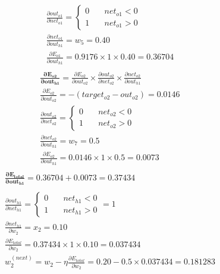 \documentclass[12pt]{article}
\begin{document}
\begin{enumerate}
\begin{gather*}
\frac{\partial{out_{o1}}}{\partial{net_{o1}}} = \begin{cases}
0 & \quad net_{o1} < 0\\
1 & \quad net_{o1} > 0
\end{cases}\\
\frac{\partial{net_{o1}}}{\partial{out_{h1}}} = w_5 = 0.40\\
\frac{\partial{E_{o1}}}{\partial{out_{h1}}} = 0.9176 \times 1 \times 0.40 = 0.36704\\
\end{gather*}
\begin{gather*}
\mathbf{\frac{\partial{E_{o2}}}{\partial{out_{h1}}}} =  \frac{\partial{E_{o2}}}{\partial{out_{o2}}} \times \frac{\partial{out_{o2}}}{\partial{net_{o2}}} \times \frac{\partial{net_{o2}}}{\partial{out_{h1}}}\\
\frac{\partial{E_{o2}}}{\partial{out_{o2}}} = -(target_{o2} - out_{o2}) = 0.0146\\
\frac{\partial{out_{o2}}}{\partial{net_{o2}}} = \begin{cases}
0 & \quad net_{o2} < 0\\
1 & \quad net_{o2} > 0
\end{cases}\\
\frac{\partial{net_{o2}}}{\partial{out_{h1}}} = w_7 = 0.5\\
\frac{\partial{E_{o2}}}{\partial{out_{h1}}} = 0.0146 \times 1 \times 0.5 = 0.0073\\
\end{gather*}
\begin{gather*}
\mathbf{\frac{\partial{E_{total}}}{\partial{out_{h1}}}} = 0.36704 + 0.0073 = 0.37434\\\\
\frac{\partial{out_{h1}}}{\partial{net_{h1}}} = \begin{cases}
0 & \quad net_{h1} < 0\\
1 & \quad net_{h1} > 0
\end{cases} = 1\\
\frac{\partial{net_{h1}}}{\partial{w_{2}}} = x_2 = 0.10\\
\frac{\partial{E_{total}}}{\partial{w_{2}}} = 0.37434 \times 1 \times 0.10 = 0.037434\\
w_2^{(next)} = w_2 - \eta \frac{\partial{E_{total}}}{\partial{w_{2}}} = 0.20 - 0.5 \times 0.037434 = 0.181283
\end{gather*}
\end{enumerate}
\end{document}
